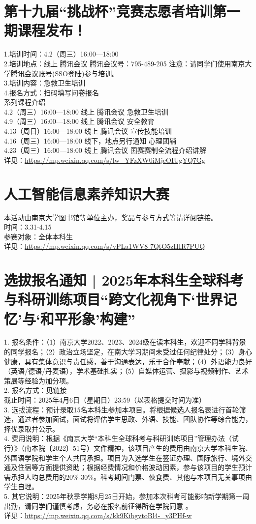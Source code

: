\documentclass[letterpaper, 12pt]{article}
\begin{document}
\begin{multicols}{2}
\section{第十九届“挑战杯”竞赛志愿者培训第一期课程发布！}
1.培训时间：4.2（周三）16:00—18:00
\\2.培训地点：线上 腾讯会议 腾讯会议号：795-489-205 注意：请同学们使用南京大学腾讯会议账号(SSO登陆)参与培训。
\\3.培训内容：急救卫生培训
\\4.报名方式：扫码填写问卷报名
\\系列课程介绍
\\4.2（周三）16:00—18:00 线上 腾讯会议 急救卫生培训
\\4.9（周三）16:00—18:00 线上 腾讯会议 安全教育
\\4.13（周日）16:00—18:00 线上 腾讯会议 宣传技能培训
\\4.16（周三）16:00—18:00 线下，地点另行通知 心理团辅
\\4.23（周三）16:00—18:00 线上 腾讯会议 国赛赛制全流程介绍讲解
\\详见：\url{https://mp.weixin.qq.com/s/lw_YFzXW0iMjeOIUgYQ7Gg}

\section{人工智能信息素养知识大赛}
本活动由南京大学图书馆等单位主办，奖品与参与方式等请详阅链接。
\\时间：3.31-4.15
\\参赛对象：全体本科生
\\详见：\url{https://mp.weixin.qq.com/s/vPLa1WV8-7QtO5zHIR7PUQ}
\section{选拔报名通知 | 2025年本科生全球科考与科研训练项目“跨文化视角下‘世界记忆’与‘和平形象’构建”}
1. 报名条件：（1）南京大学2022、2023、2024级在读本科生，欢迎不同学科背景的同学报名；（2）政治立场坚定，在南大学习期间未受过任何纪律处分；（3）身心健康，具有集体意识与责任感，善于沟通表达，乐于合作奉献；（4）外语能力良好（英语/德语/丹麦语），学术基础扎实；（5）自媒体运营、摄影与视频制作、艺术策展等经验为加分项。
\\2. 报名方式：见链接
\\截止时间：2025年4月6日（星期日）23:59（以表格提交时间为准）
\\3. 选拔流程：预计录取15名本科生参加本项目。将根据候选人报名表进行首轮筛选，通过者参加面试，面试将评估学生思政、外语、技能、团队协作等综合能力，择优录取并公示。
\\4. 费用说明：根据《南京大学“本科生全球科考与科研训练项目”管理办法（试行）》（南本院〔2022〕51号）文件精神，该项目产生的费用由南京大学本科生院、外国语学院和学生个人共同承担。项目为入选学生在签证办理、国际旅行、境外交通及住宿等方面提供资助；根据经费情况和价格波动因素，参与该项目的学生预计需承担人均总费用的20\%-30\%。科考期间门票、伙食费、其他与本项目无关事项由学生自理。
\\5. 其它说明：2025年秋季学期8月25日开始，参加本次科考可能影响新学期第一周出勤，请同学们谨慎考虑，务必在报名前征得所在学院同意 。
\\详见：\url{https://mp.weixin.qq.com/s/kk9KibgvtoBl4-_y3PHf-w}

\end{multicols}
\end{document}
